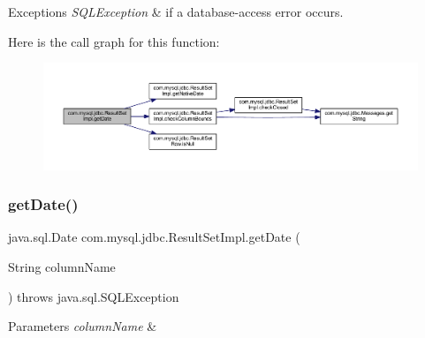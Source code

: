 \begin{DoxyExceptions}{Exceptions}
{\em S\+Q\+L\+Exception} & if a database-\/access error occurs. \\
\hline
\end{DoxyExceptions}
Here is the call graph for this function\+:
\nopagebreak
\begin{figure}[H]
\begin{center}
\leavevmode
\includegraphics[width=350pt]{classcom_1_1mysql_1_1jdbc_1_1_result_set_impl_a6d094674b92d6f3084cd92d63c8ff356_cgraph}
\end{center}
\end{figure}
\mbox{\label{classcom_1_1mysql_1_1jdbc_1_1_result_set_impl_a288cad7ec14f83f34a5b9b5d927e17f6}} 
\subsubsection{\texorpdfstring{get\+Date()}{getDate()}\hspace{0.1cm}{\footnotesize\ttfamily [3/4]}}
{\footnotesize\ttfamily java.\+sql.\+Date com.\+mysql.\+jdbc.\+Result\+Set\+Impl.\+get\+Date (\begin{DoxyParamCaption}\item[{String}]{column\+Name }\end{DoxyParamCaption}) throws java.\+sql.\+S\+Q\+L\+Exception}


\begin{DoxyParams}{Parameters}
{\em column\+Name} & \\
\hline
\end{DoxyParams}

